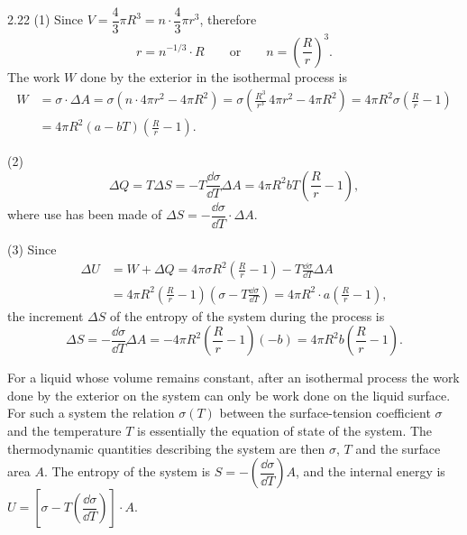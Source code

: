 \begin{solution}{2.22}
(1) Since $V=\dfrac{4}{3}\pi R^3 = n\cdot\dfrac{4}{3}\pi r^3$, therefore
\begin{equation*}
r = n^{-1/3}\cdot R\qquad\text{or}\qquad n=\left(\frac{R}{r}\right)^3 .
\end{equation*}
The work $W$ done by the exterior in the isothermal process is
\begin{align*}
W &= \sigma\cdot\Delta A = \sigma\left(n\cdot 4\pi r^2-4\pi R^2\right)
= \sigma\left(\frac{R^3}{r^3}\,4\pi r^2-4\pi R^2\right)
= 4\pi R^2\sigma\left(\frac{R}{r}-1\right)\\
&= 4\pi R^2\left(a-bT\right)\left(\frac{R}{r}-1\right).
\end{align*}

(2)
\begin{equation*}
\Delta Q = T\Delta S = -T\frac{\dd\sigma}{\dd T}\Delta A
= 4\pi R^2bT\left(\frac{R}{r}-1\right),
\end{equation*}
where use has been made of $\Delta S = -\dfrac{\dd\sigma}{\dd T}\cdot\Delta A$.

(3) Since
\begin{align*}
\Delta U &= W + \Delta Q = 4\pi\sigma R^2\left(\frac{R}{r}-1\right)
- T\frac{\dd\sigma}{\dd T}\Delta A\\
&= 4\pi R^2\left(\frac{R}{r}-1\right)\left(\sigma-T\frac{\dd\sigma}{\dd T}\right)
= 4\pi R^2\cdot a\left(\frac{R}{r}-1\right),
\end{align*}
the increment $\Delta S$ of the entropy of the system during the process is
\begin{equation*}
\Delta S = -\frac{\dd\sigma}{\dd T}\Delta A
= -4\pi R^2\left(\frac{R}{r}-1\right)(-b)
= 4\pi R^2b\left(\frac{R}{r}-1\right).
\end{equation*}

\begin{commentary}
For a liquid whose volume remains constant, after an isothermal process the work done by the
exterior on the system can only be work done on the liquid surface. For such a system the
relation $\sigma(T)$ between the surface-tension coefficient $\sigma$ and the temperature $T$ is
essentially the equation of state of the system. The thermodynamic quantities describing the
system are then $\sigma$, $T$ and the surface area $A$. The entropy of the system is
$S=-\left(\dfrac{\dd\sigma}{\dd T}\right)A$, and the internal energy is
$U=\left[\sigma-T\left(\dfrac{\dd\sigma}{\dd T}\right)\right]\cdot A$.
\end{commentary}
\end{solution}

